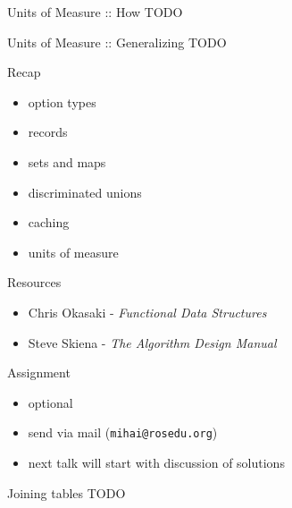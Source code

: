 \documentclass{beamer}
\begin{document}
\begin{frame}{Units of Measure :: How}
  TODO
\end{frame}

\begin{frame}{Units of Measure :: Generalizing}
  TODO
\end{frame}

\begin{frame}{Recap}
  \begin{itemize}[<+->]
    \item option types
    \item records
    \item sets and maps
    \item discriminated unions
    \item caching
    \item units of measure
  \end{itemize}
\end{frame}

\begin{frame}{Resources}
  \begin{itemize}
    \item Chris Okasaki - \textit{Functional Data Structures}
    \item Steve Skiena - \textit{The Algorithm Design Manual}
  \end{itemize}
\end{frame}

\begin{frame}[fragile]{Assignment}
  \begin{itemize}
    \item optional
    \item send via mail (\texttt{mihai@rosedu.org})
    \item next talk will start with discussion of solutions
  \end{itemize}
  \pause
  \begin{block}{Joining tables}
  TODO
  \end{block}
\end{frame}
\end{document}
